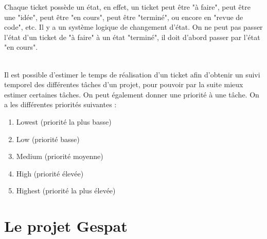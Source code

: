 \documentclass[12pt,oneside,noprintercorrection]{iut}
\begin{document}
Chaque ticket possède un état, en effet, un ticket peut être "à faire", peut être une "idée", peut être "en cours", peut être "terminé", ou encore en "revue de code", etc. Il y a un système logique de changement d'état. On ne peut pas passer l'état d'un ticket de "à faire" à un état "terminé", il doit d'abord passer par l'état "en cours".

~\\\indent Il est possible d'estimer le temps de réalisation d'un ticket afin d'obtenir un suivi temporel des différentes tâches d'un projet, pour pouvoir par la suite mieux estimer certaines tâches. On peut également donner une priorité à une tâche. On a les différentes priorités suivantes : 
\begin{enumerate}
    \item Lowest (priorité la plus basse)
    \item Low (priorité basse)
    \item Medium (priorité moyenne)
    \item High (priorité élevée)
    \item Highest (priorité la plus élevée)
\end{enumerate}

\section{Le projet Gespat}
\end{document}
